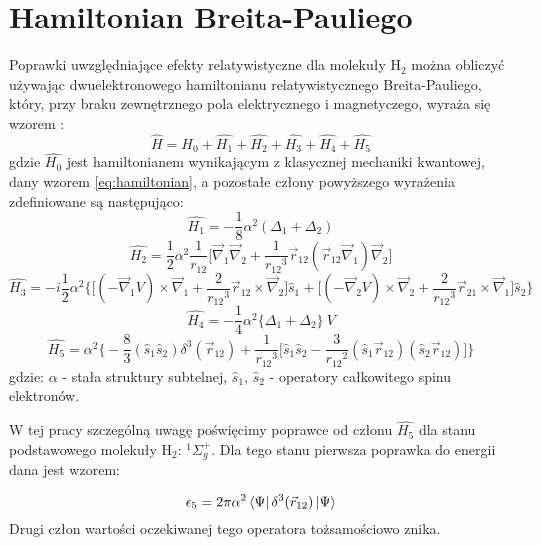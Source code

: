\documentclass[a4paper,12pt]{article}
\numberwithin{equation}{section}
\numberwithin{table}{section}
\numberwithin{figure}{section}
\begin{document}
\section{Hamiltonian Breita-Pauliego} \label{sec:rel}
Poprawki uwzględniające efekty relatywistyczne dla molekuły H$_2$ można obliczyć używając dwuelektronowego hamiltonianu relatywistycznego Breita-Pauliego, który, przy braku zewnętrznego pola elektrycznego i magnetyczego, wyraża się wzorem \cite{kolos64}:
\begin{equation}
\hat{H} = \hat{H_0} + \hat{H_1}+ \hat{H_2}+ \hat{H_3}+ \hat{H_4}+ \hat{H_5}
\end{equation}
gdzie $\hat{H_0}$ jest hamiltonianem wynikającym z klasycznej mechaniki kwantowej, dany wzorem \eqref{eq:hamiltonian}, a pozostałe człony powyższego wyrażenia zdefiniowane są następująco:
\begin{equation}
\hat{H_1} = -\frac{1}{8}\alpha^2(\Delta_1 + \Delta_2)
\end{equation}
\begin{equation}
\hat{H_2} = \frac{1}{2}\alpha^2 \frac{1}{r_{12}} \big[\vec{\nabla}_1 \vec{\nabla}_2 + \frac{1}{{r_{12}}^3} \vec{r}_{12} ( \vec{r}_{12} \vec{\nabla}_1)\vec{\nabla}_2\big] 
\end{equation}
\begin{equation}
\hat{H_3} = -i \frac{1}{2} \alpha^2 \Big\{ \big[ (-\vec{\nabla}_1 V)\times \vec{\nabla}_1 + \frac{2}{{r_{12}}^3} \vec{r}_{12} \times \vec{\nabla}_2\big]\hat{s}_1 + \big[(-\vec{\nabla}_2 V) \times \vec{\nabla}_2 + \frac{2}{{r_{12}}^3} \vec{r}_{21} \times \vec{\nabla}_1 \big] \hat{s}_2 \Big\}
\end{equation}
\begin{equation}
\hat{H_4} = -\frac{1}{4} \alpha^2 \{\Delta_1  + \Delta_2 \}\: V
\end{equation}
\begin{equation}
\hat{H_5} = \alpha^2 \Big\{ -\frac{8}{3} (\hat{s}_1 \hat{s}_2)\delta^3(\vec{r}_{12}) + \frac{1}{{r_{12}}^3} \big[ \hat{s}_1 \hat{s}_2 - \frac{3}{{r_{12}}^2} (\hat{s}_1 \vec{r}_{12}) (\hat{s}_2 \vec{r}_{12}) \big] \Big\}
\end{equation}
gdzie: $\alpha$ - stała struktury subtelnej, $\hat{s}_1$, $\hat{s}_2$ - operatory całkowitego spinu elektronów.

W tej pracy szczególną uwagę poświęcimy poprawce od członu $\hat{H_5}$ dla stanu podstawowego molekuły H$_2$: ${}^1\Sigma_g^+$. Dla tego stanu pierwsza poprawka do energii dana jest wzorem:

\begin{equation}
\epsilon_5 = 2\pi \alpha^2 \bra{\Psi}\delta^3(\vec{r}_{12})\ket{\Psi}
\end{equation}
Drugi człon wartości oczekiwanej tego operatora tożsamościowo znika.
\end{document}
